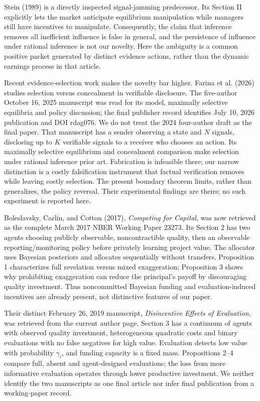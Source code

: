 \documentclass[11pt]{article}
\begin{document}
Stein (1989) is a directly inspected signal-jamming predecessor. Its Section II explicitly lets the market anticipate equilibrium manipulation while managers still have incentives to manipulate. Consequently, the claim that inference removes all inefficient influence is false in general, and the persistence of influence under rational inference is not our novelty. Here the ambiguity is a common positive packet generated by distinct evidence actions, rather than the dynamic earnings process in that article.

Recent evidence-selection work makes the novelty bar higher. Farina et al. (2026) studies selection versus concealment in verifiable disclosure. The five-author October 16, 2025 manuscript was read for its model, maximally selective equilibria and policy discussion; the final publisher record identifies July 10, 2026 publication and DOI rdag076. We do not treat the 2024 four-author draft as the final paper. That manuscript has a sender observing a state and $N$ signals, disclosing up to $K$ verifiable signals to a receiver who chooses an action. Its maximally selective equilibrium and concealment comparison make selection under rational inference prior art. Fabrication is infeasible there; our narrow distinction is a costly falsification instrument that factual verification removes while leaving costly selection. The present boundary theorem limits, rather than generalizes, the policy reversal. Their experimental findings are theirs; no such experiment is reported here.

Boleslavsky, Carlin, and Cotton (2017), \emph{Competing for Capital}, was now retrieved as the complete March 2017 NBER Working Paper 23273. Its Section 2 has two agents choosing publicly observable, noncontractible quality, then an observable reporting/monitoring policy before privately learning project value. The allocator uses Bayesian posteriors and allocates sequentially without transfers. Proposition 1 characterizes full revelation versus mixed exaggeration; Proposition 3 shows why prohibiting exaggeration can reduce the principal's payoff by discouraging quality investment. Thus noncommitted Bayesian funding and evaluation-induced incentives are already present, not distinctive features of our paper.

Their distinct February 26, 2019 manuscript, \emph{Disincentive Effects of Evaluation}, was retrieved from the current author page. Section 3 has a continuum of agents with observed quality investment, heterogeneous quadratic costs and binary evaluations with no false negatives for high value. Evaluation detects low value with probability $\gamma_i$, and funding capacity is a fixed mass. Propositions 2--4 compare full, absent and agent-designed evaluations; the loss from more informative evaluation operates through lower productive investment. We neither identify the two manuscripts as one final article nor infer final publication from a working-paper record.
\end{document}
